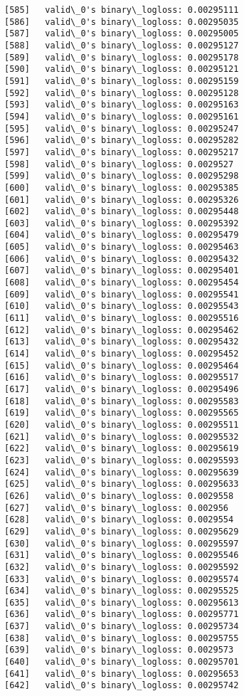\documentclass[11pt]{article}
\begin{document}
\begin{Verbatim}[commandchars=\\\{\}]
[585]	valid\_0's binary\_logloss: 0.00295111
[586]	valid\_0's binary\_logloss: 0.00295035
[587]	valid\_0's binary\_logloss: 0.00295005
[588]	valid\_0's binary\_logloss: 0.00295127
[589]	valid\_0's binary\_logloss: 0.00295178
[590]	valid\_0's binary\_logloss: 0.00295121
[591]	valid\_0's binary\_logloss: 0.00295159
[592]	valid\_0's binary\_logloss: 0.00295128
[593]	valid\_0's binary\_logloss: 0.00295163
[594]	valid\_0's binary\_logloss: 0.00295161
[595]	valid\_0's binary\_logloss: 0.00295247
[596]	valid\_0's binary\_logloss: 0.00295282
[597]	valid\_0's binary\_logloss: 0.00295217
[598]	valid\_0's binary\_logloss: 0.0029527
[599]	valid\_0's binary\_logloss: 0.00295298
[600]	valid\_0's binary\_logloss: 0.00295385
[601]	valid\_0's binary\_logloss: 0.00295326
[602]	valid\_0's binary\_logloss: 0.00295448
[603]	valid\_0's binary\_logloss: 0.00295392
[604]	valid\_0's binary\_logloss: 0.00295479
[605]	valid\_0's binary\_logloss: 0.00295463
[606]	valid\_0's binary\_logloss: 0.00295432
[607]	valid\_0's binary\_logloss: 0.00295401
[608]	valid\_0's binary\_logloss: 0.00295454
[609]	valid\_0's binary\_logloss: 0.00295541
[610]	valid\_0's binary\_logloss: 0.00295543
[611]	valid\_0's binary\_logloss: 0.00295516
[612]	valid\_0's binary\_logloss: 0.00295462
[613]	valid\_0's binary\_logloss: 0.00295432
[614]	valid\_0's binary\_logloss: 0.00295452
[615]	valid\_0's binary\_logloss: 0.00295464
[616]	valid\_0's binary\_logloss: 0.00295517
[617]	valid\_0's binary\_logloss: 0.00295496
[618]	valid\_0's binary\_logloss: 0.00295583
[619]	valid\_0's binary\_logloss: 0.00295565
[620]	valid\_0's binary\_logloss: 0.00295511
[621]	valid\_0's binary\_logloss: 0.00295532
[622]	valid\_0's binary\_logloss: 0.00295619
[623]	valid\_0's binary\_logloss: 0.00295593
[624]	valid\_0's binary\_logloss: 0.00295639
[625]	valid\_0's binary\_logloss: 0.00295633
[626]	valid\_0's binary\_logloss: 0.0029558
[627]	valid\_0's binary\_logloss: 0.002956
[628]	valid\_0's binary\_logloss: 0.0029554
[629]	valid\_0's binary\_logloss: 0.00295629
[630]	valid\_0's binary\_logloss: 0.00295597
[631]	valid\_0's binary\_logloss: 0.00295546
[632]	valid\_0's binary\_logloss: 0.00295592
[633]	valid\_0's binary\_logloss: 0.00295574
[634]	valid\_0's binary\_logloss: 0.00295525
[635]	valid\_0's binary\_logloss: 0.00295613
[636]	valid\_0's binary\_logloss: 0.00295771
[637]	valid\_0's binary\_logloss: 0.00295734
[638]	valid\_0's binary\_logloss: 0.00295755
[639]	valid\_0's binary\_logloss: 0.0029573
[640]	valid\_0's binary\_logloss: 0.00295701
[641]	valid\_0's binary\_logloss: 0.00295653
[642]	valid\_0's binary\_logloss: 0.00295742

\end{Verbatim}
\end{document}
